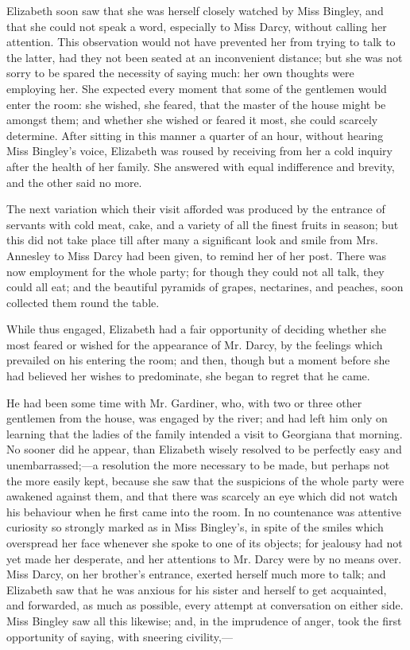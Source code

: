 \documentclass[10pt]{book}
\begin{document}
   Elizabeth soon saw that she was herself closely watched by Miss Bingley,
and that she could not speak a word, especially to Miss Darcy, without
calling her attention.
   This observation would not have prevented her
from trying to talk to the latter, had they not been seated at an
inconvenient distance; but she was not sorry to be spared the necessity
of saying much: her own thoughts were employing her. She expected every
moment that some of the gentlemen would enter the room: she wished, she
feared, that the master of the house might be amongst them; and whether
she wished or feared it most, she could scarcely determine. After
sitting in this manner a quarter of an hour, without hearing Miss
Bingley’s voice, Elizabeth was roused by receiving from her a cold
inquiry after the health of her family. She answered with equal
indifference and brevity, and the other said no more.
  

   The next variation which their visit afforded was produced by the
entrance of servants with cold meat, cake, and a variety of all the
finest fruits in season; but this did not take place till after many a
significant look and smile from Mrs. Annesley to Miss Darcy had been
given, to remind her of her post. There was now employment for the whole
party; for though they could not all talk, they could all eat; and the
beautiful pyramids of grapes, nectarines, and peaches, soon collected
them round the table.
  

   While thus engaged, Elizabeth had a fair opportunity of deciding whether
she most feared or wished for the appearance of Mr. Darcy, by the
feelings which prevailed on his entering the room; and then, though but
a moment before she had believed her wishes to predominate, she began to
regret that he came.
  

   He had been some time with Mr. Gardiner, who, with two or three other
gentlemen from the house, was engaged by the river; and had left him
only on learning
   that the ladies of the family intended a visit to
Georgiana that morning. No sooner did he appear, than Elizabeth wisely
resolved to be perfectly easy and unembarrassed;—a resolution the more
necessary to be made, but perhaps not the more easily kept, because she
saw that the suspicions of the whole party were awakened against them,
and that there was scarcely an eye which did not watch his behaviour
when he first came into the room. In no countenance was attentive
curiosity so strongly marked as in Miss Bingley’s, in spite of the
smiles which overspread her face whenever she spoke to one of its
objects; for jealousy had not yet made her desperate, and her attentions
to Mr. Darcy were by no means over. Miss Darcy, on her brother’s
entrance, exerted herself much more to talk; and Elizabeth saw that he
was anxious for his sister and herself to get acquainted, and forwarded,
as much as possible, every attempt at conversation on either side. Miss
Bingley saw all this likewise; and, in the imprudence of anger, took the
first opportunity of saying, with sneering civility,—
  
\end{document}
